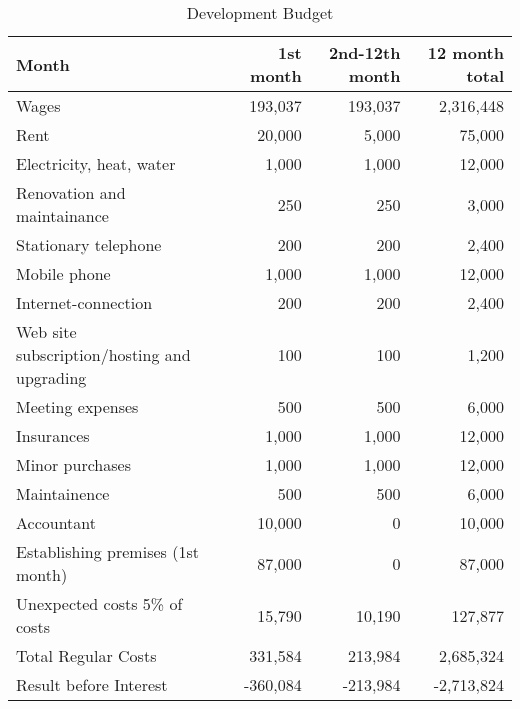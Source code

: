 \begin{table}[ht!]
\begin{tabular}{l *{3}{r}}
Month                                               &  1st month& 2nd-12th month& 12 month total\\ \hline
Wages                                               &  193,037	& 193,037       & 2,316,448    \\
Rent                                                &  20,000	& 5,000	        & 75,000       \\
Electricity, heat, water                            &  1,000	& 1,000	        & 12,000       \\
Renovation and maintainance                         &  250	& 250	        & 3,000        \\
Stationary telephone                                &  200	& 200	        & 2,400        \\
Mobile phone                                        &  1,000	& 1,000	        & 12,000       \\
Internet-connection                                 &  200	& 200	        & 2,400        \\
Web site subscription/hosting and upgrading         &  100	& 100	        & 1,200        \\
Meeting expenses                                    &  500	& 500	        & 6,000        \\
Insurances                                          &  1,000	& 1,000	        & 12,000       \\
Minor purchases                                     &  1,000	& 1,000	        & 12,000       \\
Maintainence                                        &  500	& 500	        & 6,000        \\
Accountant                                          &  10,000	& 0	        & 10,000       \\
Establishing premises (1st month)                   &  87,000	& 0	        & 87,000       \\
Unexpected costs 5\% of costs                       &  15,790	& 10,190	& 127,877      \\
Total Regular Costs                                 &  331,584	& 213,984	& 2,685,324    \\
Result before Interest                              &  -360,084	& -213,984	& -2,713,824   \\
\end{tabular}
\caption{Development Budget}
\end{table}


